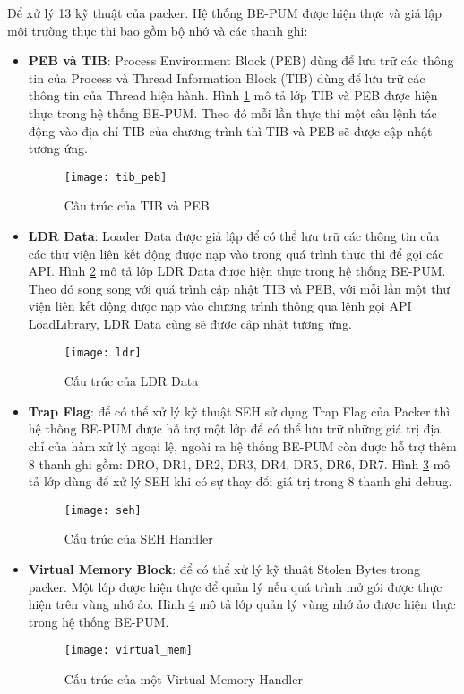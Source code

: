 \hspace{0.5cm}Để xử lý 13 kỹ thuật của packer. Hệ thống BE-PUM được hiện thực và giả lập môi trường thực thi bao gồm bộ nhớ và các thanh ghi:
\begin{itemize}
\item{\textbf{PEB và TIB}: Process Environment Block (PEB) dùng để lưu trữ các thông tin của Process và Thread Information Block (TIB) dùng để lưu trữ các thông tin của Thread hiện hành. Hình \ref {fig:TIBPEBArchi} mô tả lớp TIB và PEB được hiện thực trong hệ thống BE-PUM. Theo đó mỗi lần thực thi một câu lệnh tác động vào địa chỉ TIB của chương trình thì TIB và PEB sẽ được cập nhật tương ứng.
\begin{figure}
\centering
\texttt{[image: tib\_peb]}
\caption{Cấu trúc của TIB và PEB}
\label{fig:TIBPEBArchi}
\end{figure}
}
\item{\textbf{LDR Data}: Loader Data được giả lập để có thể lưu trữ các thông tin của các thư viện liên kết động được nạp vào trong quá trình thực thi để gọi các API. Hình \ref {fig:LDRArchi} mô tả lớp LDR Data được hiện thực trong hệ thống BE-PUM. Theo đó song song với quá trình cập nhật TIB và PEB, với mỗi lần một thư viện liên kết động được nạp vào chương trình thông qua lệnh gọi API LoadLibrary, LDR Data cũng sẽ được cập nhật tương ứng.
\begin{figure}
\centering
\texttt{[image: ldr]}
\caption{Cấu trúc của LDR Data}
\label{fig:LDRArchi}
\end{figure}
}
\item{\textbf{Trap Flag}: để có thể xử lý kỹ thuật SEH sử dụng Trap Flag của Packer thì hệ thống BE-PUM được hỗ trợ một lớp để có thể lưu trữ những giá trị địa chỉ của hàm xử lý ngoại lệ, ngoài ra hệ thống BE-PUM còn được hỗ trợ thêm 8 thanh ghi gồm: DRO, DR1, DR2, DR3, DR4, DR5, DR6, DR7. Hình \ref {fig:SEHHandlerArchi} mô tả lớp dùng để xử lý SEH khi có sự thay đổi giá trị trong 8 thanh ghi debug.
\begin{figure}
\centering
\texttt{[image: seh]}
\caption{Cấu trúc của SEH Handler}
\label{fig:SEHHandlerArchi}
\end{figure}
}
\item{\textbf{Virtual Memory Block}: để có thể xử lý kỹ thuật Stolen Bytes trong packer. Một lớp được hiện thực để quản lý nếu quá trình mở gói được thực hiện trên vùng nhớ ảo. Hình \ref {fig:VirtualMemArchi} mô tả lớp quản lý vùng nhớ ảo được hiện thực trong hệ thống BE-PUM.
\begin{figure}
\centering
\texttt{[image: virtual\_mem]}
\caption{Cấu trúc của một Virtual Memory Handler}
\label{fig:VirtualMemArchi}
\end{figure}
}
\end{itemize}

